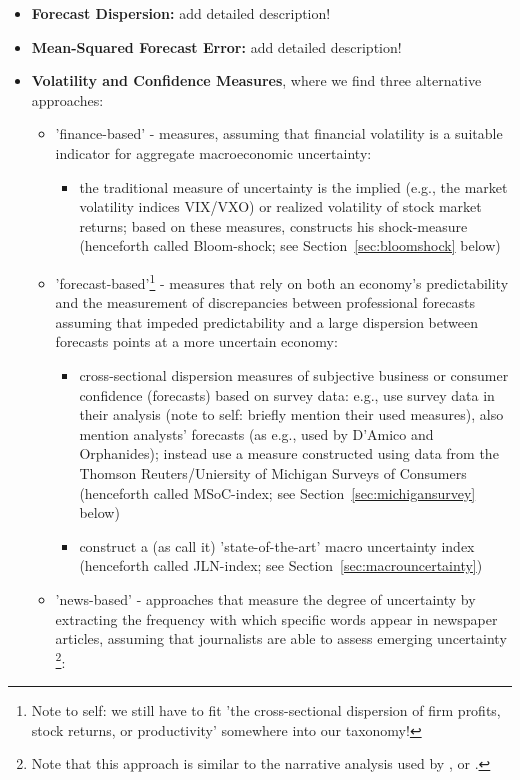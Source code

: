 \documentclass[a4paper,12pt,oneside,pointednumbers,bibtotoc,bigheadings,liststotoc]{scrbook}
\begin{document}
\begin{itemize}
	\item \textbf{Forecast Dispersion:} add detailed description!
	\item \textbf{Mean-Squared Forecast Error:} add detailed description!
	\item \textbf{Volatility and Confidence Measures}, where we find three alternative approaches:
		\begin{itemize}
			\item 'finance-based' - measures, assuming that financial volatility is a suitable indicator for aggregate macroeconomic uncertainty: 
			\begin{itemize}
				\item the traditional measure of uncertainty is the implied (e.g., the market volatility indices VIX/VXO) or realized volatility of stock market returns; based on these measures, \citet{bloom:09} constructs his shock-measure (henceforth called Bloom-shock; see Section~\ref{sec:bloomshock} below)
			\end{itemize}
			\item 'forecast-based'\footnote{Note to self: we still have to fit 'the cross-sectional dispersion of firm profits, stock returns, or productivity' somewhere into our taxonomy!} - measures that rely on both an economy's predictability and the measurement of discrepancies between professional forecasts assuming that impeded predictability and a large dispersion between forecasts points at a more uncertain economy:
			\begin{itemize}
				\item cross-sectional dispersion measures of subjective business or consumer confidence (forecasts) based on survey data: e.g., \citet{bachmannetal:13} use survey data in their analysis (note to self: briefly mention their used measures), \citet{juradoetal:15} also mention analysts' forecasts (as e.g., used by D'Amico and Orphanides); \citet{leducandliu:16} instead use a measure constructed using data from the Thomson Reuters/Uniersity of Michigan Surveys of Consumers (henceforth called MSoC-index; see Section~\ref{sec:michigansurvey} below)
				\item \citet{juradoetal:15} construct a (as \citet{orlikandveldkamp:14} call it) 'state-of-the-art' macro uncertainty index (henceforth called JLN-index; see Section~\ref{sec:macrouncertainty})
			\end{itemize}
			\item 'news-based' - approaches that measure the degree of uncertainty by extracting the frequency with which specific words appear in newspaper articles, assuming that journalists are able to assess emerging uncertainty \footnote{Note that this approach is similar to the narrative analysis used by \citet{romerandromer:04}, \citet{romandrom:17} or \citet{ramey:09}.}: 

\end{itemize}
\end{itemize}
\end{document}
